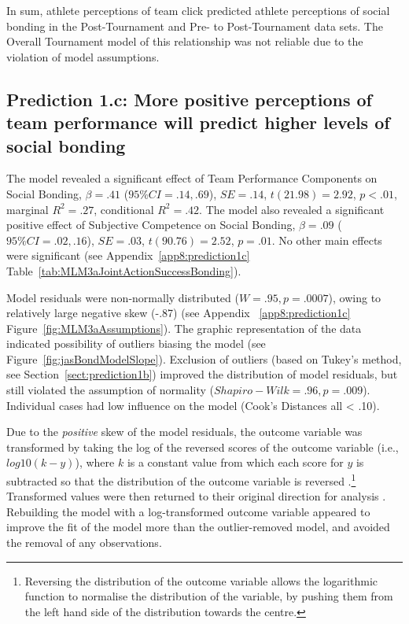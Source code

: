 \begin{CJK}{UTF8}{gbsn}


In sum, athlete perceptions of team click predicted athlete perceptions of social bonding in the Post-Tournament and Pre- to Post-Tournament data sets.  The Overall Tournament model of this relationship was not reliable due to the violation of model assumptions.






\subsection{Prediction 1.c: More positive perceptions of team performance will predict higher levels of social bonding}


The model revealed a significant effect of Team Performance Components on Social Bonding, $\beta = .41$ ($95\% CI =  .14, .69$), $SE = .14$, $t(21.98) = 2.92$, $p < .01$, marginal $R^2 = .27$, conditional $R^2 = .42$.  The model also revealed a significant positive effect of Subjective Competence on Social Bonding, $\beta = .09$ ($95\% CI =  .02, .16$), $SE = .03$, $t(90.76) = 2.52$, $p = .01$. No other main effects were significant (see Appendix~\ref{app8:prediction1c} Table~\ref{tab:MLM3aJointActionSuccessBonding}).

Model residuals were non-normally distributed ($W = .95, p = .0007$), owing to relatively large negative skew (-.87) (see Appendix ~\ref{app8:prediction1c} Figure~\ref{fig:MLM3aAssumptions}).  The graphic representation of the data indicated possibility of outliers biasing the model (see Figure~\ref{fig:jasBondModelSlope}).
Exclusion of outliers (based on Tukey's method, see Section~\ref{sect:prediction1b}) improved the distribution of model residuals, but still violated the assumption of normality ($Shapiro-Wilk = .96, p = .009$).  Individual cases had low influence on the model (Cook's Distances all < .10).

Due to the \textit{positive} skew of the model residuals, the outcome variable was transformed by taking the log of the reversed scores of the outcome variable (i.e., $log10(k - y)$), where $k$ is a constant value from which each score for $y$ is subtracted so that the distribution of the outcome variable is reversed \citep{Howell2012}.\footnote{Reversing the distribution of the outcome variable allows the logarithmic function to normalise the distribution of the variable, by pushing them from the left hand side of the distribution towards the centre.}
Transformed values were then returned to their original direction for analysis \citep{Field2012}.  Rebuilding the model with a log-transformed outcome variable appeared to improve the fit of the model more than the outlier-removed model, and avoided the removal of any observations.


\end{CJK}
